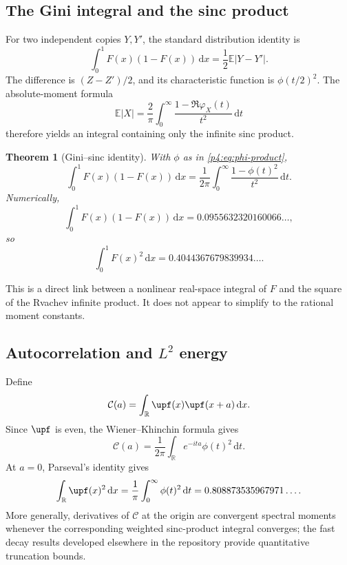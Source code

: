 \documentclass[11pt,oneside]{article}
\newtheorem{theorem}{Theorem}[section]
\theoremstyle{definition}
\theoremstyle{remark}
\newcommand{\F}{F}
\newcommand{\E}{\mathbb E}
\newcommand{\R}{\mathbb R}
\newcommand{\dd}{\,\mathrm d}
\newcommand{\1}{\mathbf 1}
\begin{document}
\subsection{The Gini integral and the sinc product}

For two independent copies \(Y,Y'\), the standard distribution identity is
\begin{equation}\label{p4:eq:Gini-prob}
 \int_0^1\F(x)(1-\F(x))\dd x
 =\frac12\E|Y-Y'|.
\end{equation}
The difference is \((Z-Z')/2\), and its characteristic function is
\(\phi(t/2)^2\).  The absolute-moment formula
\begin{equation}\label{p4:eq:absolute-char}
 \E|X|=\frac2\pi\int_0^\infty
 \frac{1-\Re\varphi_X(t)}{t^2}\dd t
\end{equation}
therefore yields an integral containing only the infinite sinc product.

\begin{theorem}[Gini--sinc identity]\label{p4:thm:gini-sinc}
With \(\phi\) as in \cref{p4:eq:phi-product},
\begin{equation}\label{p4:eq:Gini-sinc}
 \boxed{\displaystyle
 \int_0^1\F(x)(1-\F(x))\dd x
 =\frac1{2\pi}\int_0^\infty
 \frac{1-\phi(t)^2}{t^2}\dd t.}
\end{equation}
Numerically,
\begin{equation}\label{p4:eq:Gini-numeric}
 \int_0^1\F(x)(1-\F(x))\dd x
 =0.0955632320160066\ldots,
\end{equation}
so
\begin{equation}\label{p4:eq:F2-numeric}
 \int_0^1\F(x)^2\dd x
 =0.4044367679839934\ldots.
\end{equation}
\end{theorem}

This is a direct link between a nonlinear real-space integral of \(\F\) and the square
of the Rvachev infinite product.  It does not appear to simplify to the rational moment
constants.

\subsection{Autocorrelation and \(L^2\) energy}

Define
\begin{equation}\label{p4:eq:Cautocorr}
 \mathcal C(a)=\int_\R\upf(x)\upf(x+a)\dd x.
\end{equation}
Since \(\upf\) is even, the Wiener--Khinchin formula gives
\begin{equation}\label{p4:eq:autocorr-Fourier}
 \mathcal C(a)=\frac1{2\pi}
 \int_\R e^{-ita}\phi(t)^2\dd t.
\end{equation}
At \(a=0\), Parseval's identity gives
\begin{equation}\label{p4:eq:up-L2}
 \int_\R\upf(x)^2\dd x
 =\frac1\pi\int_0^\infty\phi(t)^2\dd t
 =0.808873535967971\ldots.
\end{equation}
More generally, derivatives of \(\mathcal C\) at the origin are convergent spectral
moments whenever the corresponding weighted sinc-product integral converges; the fast
decay results developed elsewhere in the repository provide quantitative truncation
bounds.
\end{document}
